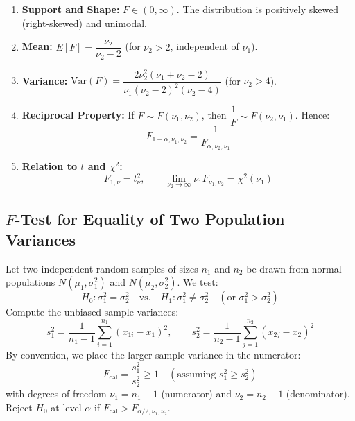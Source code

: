 \documentclass[12pt,a4paper]{article}
\begin{document}
\begin{tcolorbox}[formulabox, title={\textbf{Properties of the $F$-Distribution}}]
\begin{enumerate}[leftmargin=14pt, itemsep=2pt]
  \item \textbf{Support and Shape:} $F \in (0, \infty)$. The distribution is positively skewed (right-skewed) and unimodal.
  \item \textbf{Mean:} $E[F] = \dfrac{\nu_2}{\nu_2 - 2}$ (for $\nu_2 > 2$, independent of $\nu_1$).
  \item \textbf{Variance:} $\mathrm{Var}(F) = \dfrac{2\nu_2^2(\nu_1 + \nu_2 - 2)}{\nu_1(\nu_2 - 2)^2(\nu_2 - 4)}$ (for $\nu_2 > 4$).
  \item \textbf{Reciprocal Property:} If $F \sim F(\nu_1, \nu_2)$, then $\dfrac{1}{F} \sim F(\nu_2, \nu_1)$. Hence:
  \begin{equation}
    F_{1-\alpha, \nu_1, \nu_2} = \frac{1}{F_{\alpha, \nu_2, \nu_1}}
  \end{equation}
  \item \textbf{Relation to $t$ and $\chi^2$:}
  \begin{equation}
    F_{1, \nu} = t_\nu^2, \qquad \lim_{\nu_2 \to \infty} \nu_1 F_{\nu_1, \nu_2} = \chi^2(\nu_1)
  \end{equation}
\end{enumerate}
\end{tcolorbox}

\subsection{\texorpdfstring{$F$}{F}-Test for Equality of Two Population Variances}

\begin{tcolorbox}[formulabox, title={\textbf{$F$-Test Procedure for $\sigma_1^2 = \sigma_2^2$}}]
Let two independent random samples of sizes $n_1$ and $n_2$ be drawn from normal populations $N(\mu_1, \sigma_1^2)$ and $N(\mu_2, \sigma_2^2)$. We test:
\begin{equation}
  H_0: \sigma_1^2 = \sigma_2^2 \quad \text{vs.} \quad H_1: \sigma_1^2 \ne \sigma_2^2 \quad (\text{or } \sigma_1^2 > \sigma_2^2)
\end{equation}
Compute the unbiased sample variances:
\begin{equation}
  s_1^2 = \frac{1}{n_1 - 1}\sum_{i=1}^{n_1} (x_{1i} - \bar{x}_1)^2, \qquad s_2^2 = \frac{1}{n_2 - 1}\sum_{j=1}^{n_2} (x_{2j} - \bar{x}_2)^2
\end{equation}
By convention, we place the larger sample variance in the numerator:
\begin{equation}
  F_{\text{cal}} = \frac{s_1^2}{s_2^2} \ge 1 \quad (\text{assuming } s_1^2 \ge s_2^2)
\end{equation}
with degrees of freedom $\nu_1 = n_1 - 1$ (numerator) and $\nu_2 = n_2 - 1$ (denominator). Reject $H_0$ at level $\alpha$ if $F_{\text{cal}} > F_{\alpha/2, \nu_1, \nu_2}$.
\end{tcolorbox}
\end{document}
